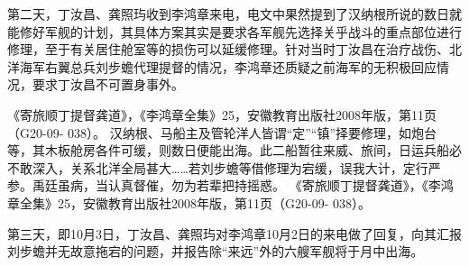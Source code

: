 \documentclass[12pt,UTF8]{ctexbook}
\begin{document}
第二天，丁汝昌、龚照玙收到李鸿章来电，电文中果然提到了汉纳根所说的数日就能修好军舰的计划，其具体方案其实是要求各军舰先选择关乎战斗的重点部位进行修理，至于有关居住舱室等的损伤可以延缓修理。针对当时丁汝昌在治疗战伤、北洋海军右翼总兵刘步蟾代理提督的情况，李鸿章还质疑之前海军的无积极回应情况，要求丁汝昌不可置身事外。

《寄旅顺丁提督龚道》，《李鸿章全集》25，安徽教育出版社2008年版，第11页（G20-09- 038）。
汉纳根、马船主及管轮洋人皆谓“定”“镇”择要修理，如炮台等，其木板舱房各件可缓，则数日便能出海。此二船暂往来威、旅间，日运兵船必不敢深入，关系北洋全局甚大……若刘步蟾等借修理为宕缓，误我大计，定行严参。禹廷虽病，当认真督催，勿为若辈把持摇惑。 《寄旅顺丁提督龚道》，《李鸿章全集》25，安徽教育出版社2008年版，第11页（G20-09- 038）。

第三天，即10月3日，丁汝昌、龚照玙对李鸿章10月2日的来电做了回复，向其汇报刘步蟾并无故意拖宕的问题，并报告除“来远”外的六艘军舰将于月中出海。
\end{document}
